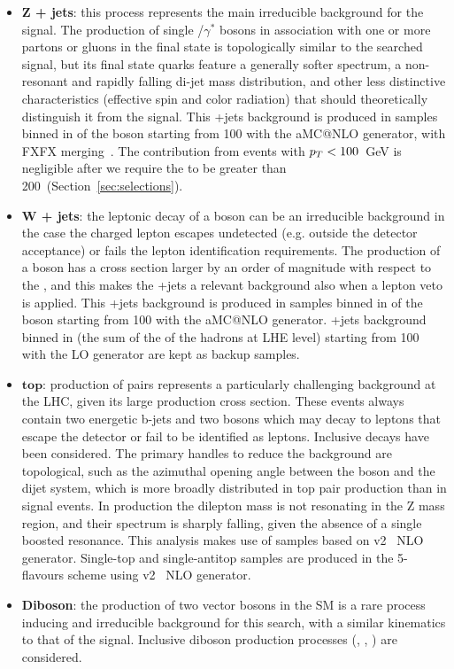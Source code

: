 \begin{itemize}
  \item {\bf Z + jets}: this process represents the main irreducible background for the signal. The production of single \Z/$\gamma^*$ bosons in association with one or more partons or gluons in the final state is topologically similar to the searched signal, but its final state quarks feature a generally softer \pt spectrum, a non-resonant and rapidly falling di-jet mass distribution, and other less distinctive characteristics (effective spin and color radiation) that should theoretically distinguish it from the signal. This \Z+jets background is produced in samples binned in \pt of the \Z boson starting from 100 \GeV with the {\sc aMC@NLO} generator, with FXFX merging~\cite{bib:FXFX}. The contribution from events with $p_T<100$~GeV is negligible after we require the \met to be greater than 200~\GeV (Section~\ref{sec:selections}).

  \item {\bf W + jets}: the leptonic decay of a \W boson can be an irreducible background in the case the charged lepton escapes undetected (e.g. outside the detector acceptance) or fails the lepton identification requirements. The production of a \W boson has a cross section larger by an order of magnitude with respect to the \Z, and this makes the \W+jets a relevant background also when a lepton veto is applied. This \W+jets background is produced in samples binned in \pt of the \W boson starting from 100 \GeV with the {\sc aMC@NLO} generator. \W+jets background binned in \HT (the sum of the \pt of the hadrons at LHE level) starting from 100 \GeV with the \MADGRAPH LO generator are kept as backup samples.

  \item $\mathbf{top}$: production of \ttbar pairs represents a particularly challenging background at the LHC, given its large production cross section. These events always contain two energetic b-jets and two \W bosons which may decay to leptons that escape the detector or fail to be identified as leptons. Inclusive \ttbar decays have been considered. The primary handles to reduce the \ttbar background are topological, such as the azimuthal opening angle between the \Z boson and the dijet system, which is more broadly distributed in top pair production than in signal events. In \ttbar production the dilepton mass is not resonating in the Z mass region, and their \pt spectrum is sharply falling, given the absence of a single boosted resonance. This analysis makes use of \ttbar samples based on \POWHEG v2~\cite{bib:POWHEGst} NLO generator.
  Single-top and single-antitop samples are produced in the 5-flavours scheme using \POWHEG v2~\cite{bib:POWHEGtt} NLO generator.
  
  \item {\bf Diboson}: the production of two vector bosons in the SM is a rare process inducing and irreducible background for this search, with a similar kinematics to that of the signal. 
  Inclusive diboson production processes (\W\W, \W\Z, \Z\Z) are considered.
\end{itemize}




